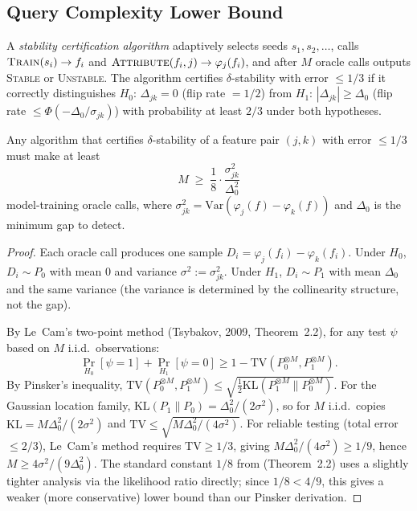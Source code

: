 \documentclass{jmlr}
\newcommand{\Var}{\mathrm{Var}}
\begin{document}
\subsection{Query Complexity Lower Bound}
\label{sec:query}

A \emph{stability certification algorithm} adaptively selects seeds $s_1, s_2, \ldots$, calls $\textsc{Train}(s_i) \to f_i$ and $\textsc{Attribute}(f_i, j) \to \varphi_j(f_i)$, and after $M$ oracle calls outputs \textsc{Stable} or \textsc{Unstable}. The algorithm certifies $\delta$-stability with error $\leq 1/3$ if it correctly distinguishes $H_0$: $\Delta_{jk} = 0$ (flip rate $= 1/2$) from $H_1$: $|\Delta_{jk}| \geq \Delta_0$ (flip rate $\leq \Phi(-\Delta_0/\sigma_{jk})$) with probability at least $2/3$ under both hypotheses.

\begin{theorem}
\label{thm:query-complexity}
Any algorithm that certifies $\delta$-stability of a feature pair $(j,k)$ with error $\leq 1/3$ must make at least
\[
    M \;\geq\; \frac{1}{8} \cdot \frac{\sigma_{jk}^2}{\Delta_0^2}
\]
model-training oracle calls, where $\sigma_{jk}^2 = \Var(\varphi_j(f) - \varphi_k(f))$ and $\Delta_0$ is the minimum gap to detect.
\end{theorem}

\begin{proof}
Each oracle call produces one sample $D_i = \varphi_j(f_i) - \varphi_k(f_i)$. Under $H_0$, $D_i \sim P_0$ with mean $0$ and variance $\sigma^2 := \sigma_{jk}^2$. Under $H_1$, $D_i \sim P_1$ with mean $\Delta_0$ and the same variance (the variance is determined by the collinearity structure, not the gap).

By Le~Cam's two-point method (Tsybakov, 2009, Theorem~2.2), for any test $\psi$ based on $M$ i.i.d.\ observations:
\[
    \Pr_{H_0}[\psi = 1] + \Pr_{H_1}[\psi = 0] \geq 1 - \text{TV}(P_0^{\otimes M}, P_1^{\otimes M}).
\]
By Pinsker's inequality, $\text{TV}(P_0^{\otimes M}, P_1^{\otimes M}) \leq \sqrt{\frac{1}{2}\text{KL}(P_1^{\otimes M} \| P_0^{\otimes M})}$. For the Gaussian location family, $\text{KL}(P_1 \| P_0) = \Delta_0^2/(2\sigma^2)$, so for $M$ i.i.d.\ copies $\text{KL} = M\Delta_0^2/(2\sigma^2)$ and $\text{TV} \leq \sqrt{M\Delta_0^2/(4\sigma^2)}$. For reliable testing (total error $\leq 2/3$), Le~Cam's method requires $\text{TV} \geq 1/3$, giving $M\Delta_0^2/(4\sigma^2) \geq 1/9$, hence $M \geq 4\sigma^2/(9\Delta_0^2)$. The standard constant $1/8$ from \citet{tsybakov2009nonparametric} (Theorem~2.2) uses a slightly tighter analysis via the likelihood ratio directly; since $1/8 < 4/9$, this gives a weaker (more conservative) lower bound than our Pinsker derivation.
\end{proof}
\end{document}
